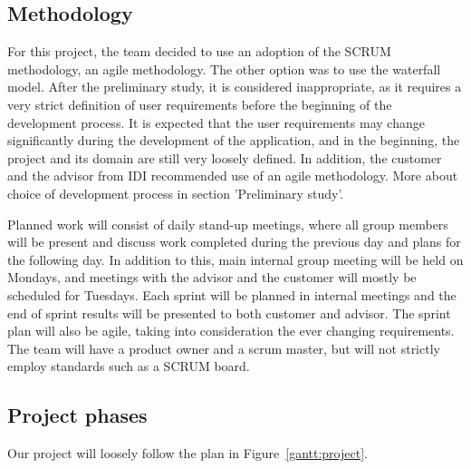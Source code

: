 \subsection{Methodology}

For this project, the team decided to use an adoption of the SCRUM methodology, an agile methodology. The other option was to use the waterfall model. After the preliminary study, it is considered inappropriate, as it requires a very strict definition of user requirements before the beginning of the development process. It is expected that the user requirements may change significantly during the development of the application, and in the beginning, the project and its domain are still very loosely defined. In addition, the customer and the advisor from IDI recommended use of an agile methodology. More about choice of development process in section 'Preliminary study'.

Planned work will consist of daily stand-up meetings, where all group members will be present and discuss work completed during the previous day and plans for the following day. 
In addition to this, main internal group meeting will be held on Mondays, and meetings with the advisor and the customer will mostly be scheduled for Tuesdays.
Each sprint will be planned in internal meetings and the end of sprint results will be presented to both customer and advisor.
The sprint plan will also be agile, taking into consideration the ever changing requirements. 
The team will have a product owner and a scrum master, but will not strictly employ standards such as a SCRUM board. 

\subsection{Project phases}

Our project will loosely follow the plan in Figure~\ref{gantt:project}.

